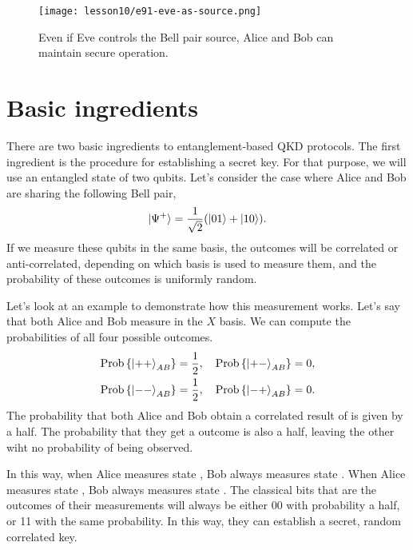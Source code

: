 \begin{figure}[H]
    \centering
    \texttt{[image: lesson10/e91-eve-as-source.png]}
    \caption[E91 with Eve as Bell pair source.]{Even if Eve controls the Bell pair source, Alice and Bob can maintain secure operation.}
    \label{fig:eve-e91}
\end{figure}





\section{Basic ingredients}
\label{sec:E91-basic-ingredients}

There are two basic ingredients to entanglement-based QKD protocols.
The first ingredient is the procedure for establishing a secret key.
For that purpose, we will use an entangled state of two qubits.
Let's consider the case where Alice and Bob are sharing the following Bell pair,
\begin{align}
    |\Psi^{+}\rangle = \frac{1}{\sqrt{2}}(\left| 01 \right\rangle+\left| 10 \right\rangle).
\end{align}
If we measure these qubits in the same basis, the outcomes will be
correlated or anti-correlated, depending on which basis is used to measure them, and the probability of these outcomes is uniformly random.

Let's look at an example to demonstrate how this measurement works.
Let's say that both Alice and Bob measure in the $X$ basis.
We can compute the probabilities of all four possible outcomes.
\begin{align}
\begin{aligned}
    \operatorname{Prob}\left\{\left| ++ \right\rangle_{A B}\right\} & = \frac{1}{2}, \quad  \operatorname{Prob}\left\{\left| +- \right\rangle_{A B}\right\} = 0, \\
    \operatorname{Prob}\left\{\left| -- \right\rangle_{A B}\right\} & = \frac{1}{2}, \quad \operatorname{Prob}\left\{\left| -+ \right\rangle_{A B}\right\} = 0.
\end{aligned}
\end{align}
The probability that both Alice and Bob obtain a correlated result of \ket{++} is given by a half.
The probability that they get a \ket{--} outcome is also a half,
leaving the other wiht no probability of being observed.

In this way, when Alice measures state \ket{+}, Bob always measures state \ket{+}.
When Alice measures state \ket{-}, Bob always measures state \ket{-}.
The classical bits that are the outcomes of their measurements will always be either 00 with probability a half, or 11 with the same probability.
In this way, they can establish a secret, random correlated key.

